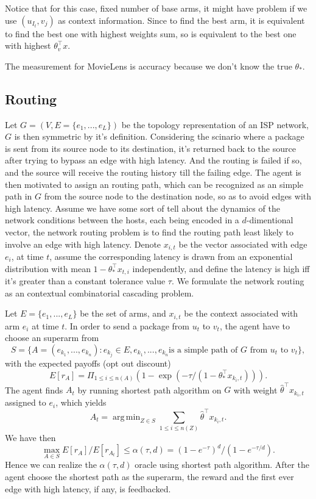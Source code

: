 \documentclass[a4paper,11pt]{article}
\DeclareMathOperator*{\argmin}{arg\,min}
\begin{document}
Notice that for this case, fixed number of base arms, it might have problem if we use $(u_{I_t}, v_j)$ as context information.
Since to find the best arm, it is equivalent to find the best one with highest weights sum, so is equivalent to the best one with highest $\theta_{v}^{\top}x$.

The measurement for MovieLens is accuracy because we don't know the true $\theta_{\ast}$.

\subsection{Routing}

Let $G=(V,E=\{e_1,...,e_L\})$ be the topology representation of an ISP network, $G$ is then symmetric by it's definition. 
Considering the scinario where a package is sent from its source node to its destination, it's returned back to the source after trying to bypass an edge with high latency.
And the routing is failed if so, and the source will receive the routing history till the failing edge.
The agent is then motivated to assign an routing path, which can be recognized as an simple path in $G$ from the source node to the destination node, so as to avoid edges with high latency. 
Assume we have some sort of tell about the dynamics of the network conditions between the hosts, each being encoded in a $d$-dimentional vector, the network routing problem is to find the routing path least likely to involve an edge with high latency.
Denote $x_{i,t}$ be the vector associated with edge $e_i$, at time $t$, assume the corresponding latency is drawn from an exponential distribution with mean $1 - \theta_{\ast}^{\top}x_{t,i}$ independently,
and define the latency is high iff it's greater than a constant tolerance value $\tau$.
We formulate the network routing as an contextual combinatorial cascading problem.

Let $E=\{e_1,...,e_L\}$ be the set of arms, and $x_{i,t}$ be the context associated with arm $e_i$ at time $t$.
In order to send a package from $u_t$ to $v_t$,
the agent have to choose an superarm from $$S=\{A=(e_{k_1},...,e_{k_n}):e_{k_j}\in E, e_{k_1},...,e_{k_n} \text{is a simple path of } G \text{ from } u_t \text{ to } v_t\},$$
with the expected payoffs (opt out discount) $$E[r_A]=\Pi_{1\leq i\leq n(A)}(1-\exp(-\tau/(1-\theta_{\ast}^{\top}x_{k_i,t}))).$$
The agent finds $A_t$ by running shortest path algorithm on $G$ with weight $\hat{\theta}^{\top}x_{k_i,t}$ assigned to $e_i$, which yields $$A_t=\argmin_{Z\in S}\sum_{1\leq i\leq n(Z)}\hat{\theta}^{\top}x_{k_i,t}.$$
We have then $$\max_{A\in S}E[r_A]/E[r_{A_t}]\leq \alpha(\tau, d) = (1-e^{-\tau})^d/(1-e^{-\tau / d}).$$
Hence we can realize the $\alpha(\tau, d)$ oracle using shortest path algorithm.
After the agent choose the shortest path as the superarm, the reward and the first ever edge with high latency, if any, is feedbacked.
\end{document}
